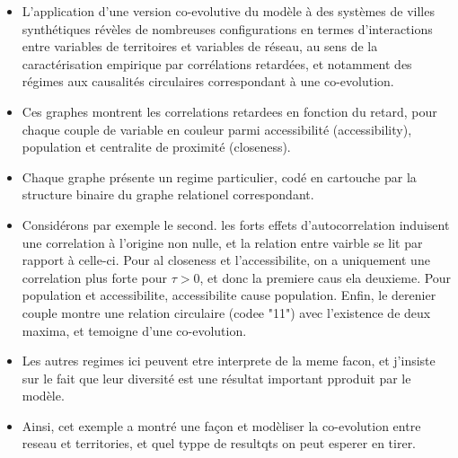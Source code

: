 \documentclass[12pt]{article}
\begin{document}
\begin{itemize}
	\item L'application d'une version co-evolutive du modèle à des systèmes de villes synthétiques révèles de nombreuses configurations en termes d'interactions entre variables de territoires et variables de réseau, au sens de la caractérisation empirique par corrélations retardées, et notamment des régimes aux causalités circulaires correspondant à une co-evolution.
	\item Ces graphes montrent les correlations retardees en fonction du retard, pour chaque couple de variable en couleur parmi accessibilité (accessibility), population et centralite de proximité (closeness).
	\item Chaque graphe présente un regime particulier, codé en cartouche par la structure binaire du graphe relationel correspondant.
	\item Considérons par exemple le second. les forts effets d'autocorrelation induisent une correlation à l'origine non nulle, et la relation entre vairble se lit par rapport à celle-ci. Pour al closeness et l'accessibilite, on a uniquement une correlation plus forte pour $\tau > 0$, et donc la premiere caus ela deuxieme. Pour population et accessibilite, accessibilite cause population. Enfin, le derenier couple montre une relation circulaire (codee "11") avec l'existence de deux maxima, et temoigne d'une co-evolution.
	\item Les autres regimes ici peuvent etre interprete de la meme facon, et j'insiste sur le fait que leur diversité est une résultat important pproduit par le modèle.
	\item Ainsi, cet exemple a montré une façon et modèliser la co-evolution entre reseau et territories, et quel typpe de resultqts on peut esperer en tirer.
\end{itemize}

\end{document}
